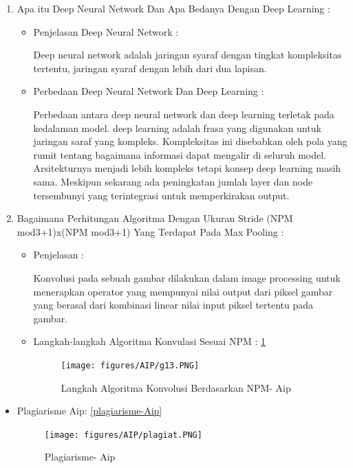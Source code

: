 \begin{enumerate}
\item Apa itu Deep Neural Network Dan Apa Bedanya Dengan Deep Learning :
\begin{itemize}
\item Penjelasan Deep Neural Network : 
\par  Deep neural network adalah jaringan syaraf dengan tingkat kompleksitas tertentu, jaringan syaraf dengan lebih dari dua lapisan.
\par
\item Perbedaan Deep Neural Network Dan Deep Learning :
\par  Perbedaan antara deep neural network dan deep learning terletak pada kedalaman model. deep learning adalah frasa yang digunakan untuk jaringan saraf yang kompleks. Kompleksitas ini disebabkan oleh pola yang rumit tentang bagaimana informasi dapat mengalir di seluruh model. Arsitekturnya menjadi lebih kompleks tetapi konsep deep learning masih sama. Meskipun sekarang ada peningkatan jumlah layer dan node tersembunyi yang terintegrasi untuk memperkirakan output.
\end{itemize}
\par
\par

\item Bagaimana Perhitungan Algoritma Dengan Ukuran Stride (NPM mod3+1)x(NPM mod3+1) Yang  Terdapat Pada Max Pooling :
\begin{itemize}
\item Penjelasan :
\par Konvolusi pada sebuah gambar dilakukan dalam image processing untuk menerapkan operator yang mempunyai nilai output dari piksel gambar yang berasal dari kombinasi linear nilai input piksel tertentu pada gambar.
\par
\item Langkah-langkah Algoritma Konvulasi Sesuai NPM : \ref{chapter-7-algoritma-konvolusi-Aip}
\par
\par
\begin{figure}[!hbtp]
\centering
\texttt{[image: figures/AIP/g13.PNG]}
\caption{Langkah Algoritma Konvolusi Berdasarkan NPM- Aip}
\label{chapter-7-algoritma-konvolusi-Aip}
\end{figure}
\par
\par
\end{itemize}
\end{enumerate}

\begin{itemize}
\item  Plagiarisme Aip: \ref{plagiarisme-Aip}
\par
\begin{figure}[!hbtp]
\centering
\texttt{[image: figures/AIP/plagiat.PNG]}
\caption{Plagiarisme- Aip}
\label{chapter-7-plagiarisme-Aip}
\end{figure}
\par
\par
\end{itemize}


